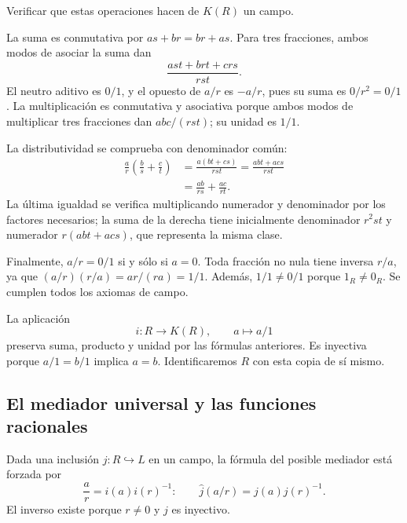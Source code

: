 \begin{ejer}\label{ejer:C18-campo}
Verificar que estas operaciones hacen de $K(R)$ un campo.
\end{ejer}
\begin{sol}
La suma es conmutativa por $as+br=br+as$. Para tres fracciones, ambos modos de asociar la suma dan
\[
\frac{ast+brt+crs}{rst}.
\]
El neutro aditivo es $0/1$, y el opuesto de $a/r$ es $-a/r$, pues su suma es $0/r^2=0/1$. La multiplicación es conmutativa y asociativa porque ambos modos de multiplicar tres fracciones dan $abc/(rst)$; su unidad es $1/1$.

La distributividad se comprueba con denominador común:
\[
\begin{aligned}
\frac ar\left(\frac bs+\frac ct\right)
&=\frac{a(bt+cs)}{rst}
=\frac{abt+acs}{rst}\\
&=\frac{ab}{rs}+\frac{ac}{rt}.
\end{aligned}
\]
La última igualdad se verifica multiplicando numerador y denominador por los factores necesarios; la suma de la derecha tiene inicialmente denominador $r^2st$ y numerador $r(abt+acs)$, que representa la misma clase.

Finalmente, $a/r=0/1$ si y sólo si $a=0$. Toda fracción no nula tiene inversa $r/a$, ya que $(a/r)(r/a)=ar/(ra)=1/1$. Además, $1/1\ne0/1$ porque $1_R\ne0_R$. Se cumplen todos los axiomas de campo.
\end{sol}
La aplicación
\[
i:R\longrightarrow K(R),\qquad a\longmapsto a/1
\]
preserva suma, producto y unidad por las fórmulas anteriores. Es inyectiva porque $a/1=b/1$ implica $a=b$. Identificaremos $R$ con esta copia de sí mismo.

\subsection{El mediador universal y las funciones racionales}
Dada una inclusión $j:R\hookrightarrow L$ en un campo, la fórmula del posible mediador está forzada por
\[
\frac ar=i(a)i(r)^{-1}:
\qquad \widehat j(a/r)=j(a)j(r)^{-1}.
\]
El inverso existe porque $r\ne0$ y $j$ es inyectivo.

